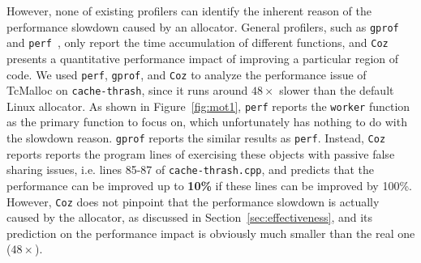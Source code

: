 However, none of existing profilers can identify the inherent reason of the performance slowdown caused by an allocator. General profilers, such as \texttt{gprof}~\cite{DBLP:conf/sigplan/GrahamKM82} and \texttt{perf}~\cite{perf}, only report the time accumulation of different functions, and \texttt{Coz}~\cite{Coz} presents a quantitative performance impact of improving a particular region of code. We used \texttt{perf}, \texttt{gprof}, and \texttt{Coz} to analyze the performance issue of TcMalloc on \texttt{cache-thrash}, since it runs around $48\times$ slower than the default Linux allocator. As shown in Figure~\ref{fig:mot1}, \texttt{perf} reports the \texttt{worker} function as the primary function to focus on, which unfortunately has nothing to do with the slowdown reason. \texttt{gprof} reports the similar results as \texttt{perf}. Instead, \texttt{Coz} reports reports the program lines of exercising these objects with passive false sharing issues, i.e. lines 85-87 of \texttt{cache-thrash.cpp}, and predicts that the performance can be improved up to \textbf{10\%} if these lines can be improved by 100\%. However, \texttt{Coz} does not pinpoint that the performance slowdown is actually caused by the allocator, as discussed in Section~\ref{sec:effectiveness}, and its prediction on the performance impact is obviously much smaller than the real one ($48\times$).


